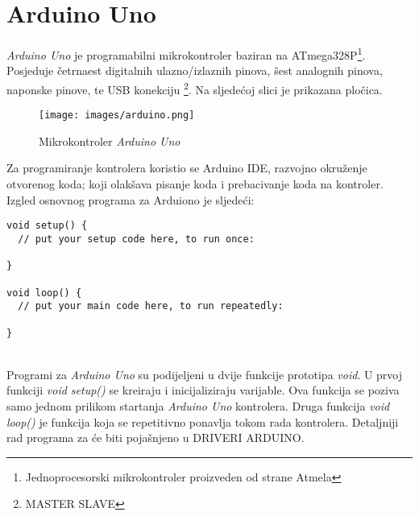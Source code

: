 \section{Arduino Uno}
\textit{Arduino Uno} je programabilni mikrokontroler baziran na ATmega328P\footnote{Jednoprocesorski mikrokontroler proizveden od strane Atmela}. Posjeduje četrnaest digitalnih ulazno/izlaznih pinova, šest analognih pinova, naponske pinove, te USB konekciju \footnote{MASTER SLAVE}. Na sljedećoj slici je prikazana  pločica.
\begin{figure}[h]
    \centering
    \texttt{[image: images/arduino.png]}
    \caption{Mikrokontroler \textit{Arduino Uno}}
    \label{fig:mesh1}
\end{figure}

Za programiranje kontrolera koristio se Arduino IDE, razvojno okruženje otvorenog koda; koji olakšava pisanje koda i prebacivanje koda na kontroler.\\

Izgled osnovnog programa za Arduiono je sljedeći:\\


\begin{lstlisting}[caption={Struktura Arduino programa}, label=program]
void setup() {
  // put your setup code here, to run once:

}

void loop() {
  // put your main code here, to run repeatedly:

}
\end{lstlisting}\\


Programi za \textit{Arduino Uno} su podijeljeni u dvije funkcije prototipa \textit{void}. U prvoj funkciji \textit{void setup()} se kreiraju i inicijaliziraju varijable. Ova funkcija se poziva samo jednom prilikom startanja \textit{Arduino Uno} kontrolera. Druga funkcija \textit{void loop()} je funkcija koja se repetitivno ponavlja tokom rada kontrolera. Detaljniji rad programa za  će biti pojašnjeno u DRIVERI ARDUINO.

